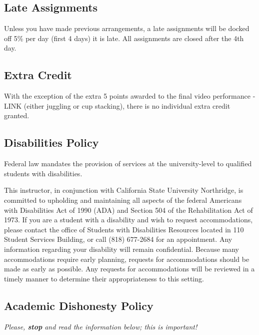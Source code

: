 \documentclass[
  letterpaper,
  DIV=11,
  numbers=noendperiod]{scrartcl}
\begin{document}
\hypertarget{late-assignments}{%
\subsection{Late Assignments}\label{late-assignments}}

Unless you have made previous arrangements, a late assignments will be
docked off 5\% per day (first 4 days) it is late. All assignments are
closed after the 4th day.

\hypertarget{extra-credit}{%
\subsection{Extra Credit}\label{extra-credit}}

With the exception of the extra 5 points awarded to the final video
performance - LINK (either juggling or cup stacking), there is no
individual extra credit granted.

\hypertarget{sec-disabilities-policy}{%
\subsection{Disabilities Policy}\label{sec-disabilities-policy}}

Federal law mandates the provision of services at the university-level
to qualified students with disabilities.

This instructor, in conjunction with California State University
Northridge, is committed to upholding and maintaining all aspects of the
federal Americans with Disabilities Act of 1990 (ADA) and Section 504 of
the Rehabilitation Act of 1973. If you are a student with a disability
and wish to request accommodations, please contact the office of
Students with Disabilities Resources located in 110 Student Services
Building, or call (818) 677-2684 for an appointment. Any information
regarding your disability will remain confidential. Because many
accommodations require early planning, requests for accommodations
should be made as early as possible. Any requests for accommodations
will be reviewed in a timely manner to determine their appropriateness
to this setting.

\hypertarget{academic-dishonesty-policy}{%
\subsection{Academic Dishonesty
Policy}\label{academic-dishonesty-policy}}

\emph{Please, \textbf{stop} and read the information below; this is
important!}
\end{document}
